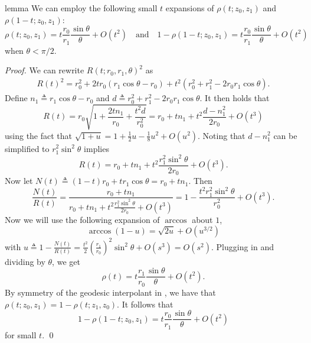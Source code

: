 \documentclass[11pt]{article}
\begin{document}
\begin{restatable}{lemma}{} \label{rho expansion}
    We can employ the following small $t$ expansions of $\rho(t; z_0, z_1)$ and $\rho(1-t; z_0, z_1)$:
    \[\rho(t; z_0, z_1) = t\frac{r_0}{r_1}\frac{\sin\theta}{\theta} + O(t^2) \quad \text{and} \quad 1 - \rho(1-t; z_0, z_1) = t\frac{r_0}{r_1}\frac{\sin\theta}{\theta} + O(t^2)\]
    when $\theta < \pi/2$.
\end{restatable}
\noindent \textit{Proof.} We can rewrite $R(t; r_0, r_1, \theta)^2$ as
\begin{align*}
    R(t)^2 = r_0^2 + 2tr_0(r_1\cos \theta - r_0) + t^2(r_0^2 + r_1^2 -2r_0r_1\cos \theta).
\end{align*}
Define $n_1 \triangleq r_1\cos \theta - r_0$ and $d \triangleq r_0^2 + r_1^2  - 2r_0r_1\cos\theta$. It then holds that
\[R(t) = r_0\sqrt{1 + \frac{2tn_1}{r_0} + \frac{t^2d}{r_0^2}} = r_0 + tn_1 + t^2\frac{d - n_1^2}{2r_0} + O(t^3)\]
using the fact that $\sqrt{1 + u} = 1 + \frac{1}{2}u - \frac{1}{8}u^2 + O(u^2)$. Noting that $d - n_1^2$ can be simplified to $r_1^2\sin^2\theta$ implies
\[R(t) = r_0 + tn_1 + t^2\frac{r_1^2\sin^2\theta}{2r_0} + O(t^3).\]
Now let $N(t) \triangleq (1-t)r_0 + tr_1\cos\theta = r_0 + tn_1.$ Then
\[\frac{N(t)}{R(t)} = \frac{r_0 + tn_1}{r_0 + tn_1 + t^2\frac{r_1^2\sin^2\theta}{2r_0} + O(t^3)} = 1 - \frac{t^2r_1^2\sin^2\theta}{r_0^2} + O(t^3).\]
Now we will use the following expansion of $\arccos$ about $1$, 
\[\arccos(1 - u) = \sqrt{2u} + O(u^{3/2})\]
with $u \triangleq 1 - \frac{N(t)}{R(t)} = \frac{t^2}{2}(\frac{r_1}{r_0})^2\sin^2\theta + O(s^3) = O(s^2). $ Plugging in and dividing by $\theta$, we get
\[\rho(t) = t\frac{r_1}{r_0}\frac{\sin \theta}{\theta} + O(t^2).\]
By symmetry of the geodesic interpolant in , we have that $\rho(t; z_0, z_1) = 1 -\rho(t; z_1, z_0).$ It follows that 
\[1 - \rho(1-t; z_0, z_1) = t\frac{r_0}{r_1}\frac{\sin \theta}{\theta} + O(t^2)\]
for small $t$. 
\qed{}
\\
\end{document}

